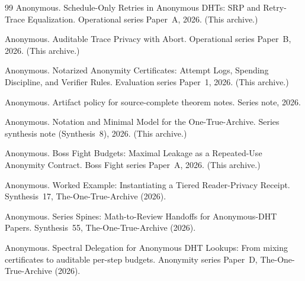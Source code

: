 \documentclass[11pt]{article}
\theoremstyle{definition}
\theoremstyle{remark}
\begin{document}
\begin{thebibliography}{99}
Anonymous.
\newblock Schedule-Only Retries in Anonymous DHTs: SRP and Retry-Trace Equalization.
\newblock Operational series Paper~A, 2026. (This archive.)

Anonymous.
\newblock Auditable Trace Privacy with Abort.
\newblock Operational series Paper~B, 2026. (This archive.)

Anonymous.
\newblock Notarized Anonymity Certificates: Attempt Logs, Spending Discipline, and Verifier Rules.
\newblock Evaluation series Paper~1, 2026. (This archive.)

Anonymous.
\newblock Artifact policy for source-complete theorem notes.
\newblock Series note, 2026.


Anonymous.
\newblock Notation and Minimal Model for the One-True-Archive.
\newblock Series synthesis note (Synthesis~8), 2026. (This archive.)

Anonymous.
\newblock Boss Fight Budgets: Maximal Leakage as a Repeated-Use Anonymity Contract.
\newblock Boss Fight series Paper~A, 2026. (This archive.)

Anonymous.
\newblock Worked Example: Instantiating a Tiered Reader-Privacy Receipt.
\newblock Synthesis~17, The-One-True-Archive (2026).

Anonymous.
\newblock Series Spines: Math-to-Review Handoffs for Anonymous-DHT Papers.
\newblock Synthesis~55, The-One-True-Archive (2026).



Anonymous.
\newblock Spectral Delegation for Anonymous DHT Lookups: From mixing certificates to auditable per-step budgets.
\newblock Anonymity series Paper~D, The-One-True-Archive (2026).

\end{thebibliography}
\end{document}
